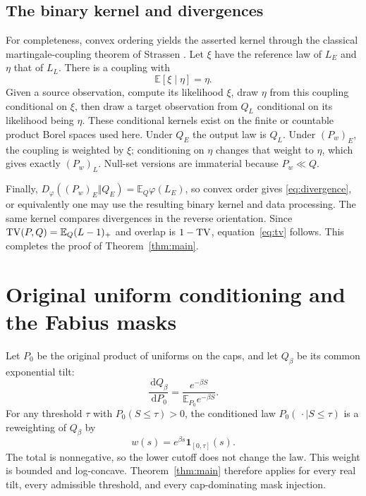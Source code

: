 \documentclass[11pt,a4paper]{article}
\theoremstyle{remark}\newtheorem*{ednote}{Editorial note (ProveIt, 2026-10-01)}
\newcommand{\E}{\mathbb E}\newcommand{\R}{\mathbb R}\newcommand{\N}{\mathbb N}
\newcommand{\ind}{\mathbf1}\newcommand{\dd}{\,\mathrm d}
\begin{document}
\subsection{The binary kernel and divergences}
For completeness, convex ordering yields the asserted kernel through the classical martingale-coupling theorem of Strassen \cite{Strassen}. Let $\xi$ have the reference law of $L_E$ and $\eta$ that of $L_L$. There is a coupling with
\[
 \E[\xi\mid\eta]=\eta.
\]
Given a source observation, compute its likelihood $\xi$, draw $\eta$ from this coupling conditional on $\xi$, then draw a target observation from $Q_L$ conditional on its likelihood being $\eta$. These conditional kernels exist on the finite or countable product Borel spaces used here. Under $Q_E$ the output law is $Q_L$. Under $(P_w)_E$, the coupling is weighted by $\xi$; conditioning on $\eta$ changes that weight to $\eta$, which gives exactly $(P_w)_L$. Null-set versions are immaterial because $P_w\ll Q$.

Finally, $D_\varphi((P_w)_E\Vert Q_E)=\E_Q\varphi(L_E)$, so convex order gives \eqref{eq:divergence}, or equivalently one may use the resulting binary kernel and data processing. The same kernel compares divergences in the reverse orientation. Since $\TV(P,Q)=\E_Q(L-1)_+$ and overlap is $1-\operatorname{TV}$, equation~\eqref{eq:tv} follows. This completes the proof of Theorem~\ref{thm:main}.

\section{Original uniform conditioning and the Fabius masks}
Let $P_0$ be the original product of uniforms on the caps, and let $Q_\beta$ be its common exponential tilt:
\[
 \frac{\dd Q_\beta}{\dd P_0}
 =\frac{e^{-\beta S}}{\E_{P_0}e^{-\beta S}}.
\]
For any threshold $\tau$ with $P_0(S\le\tau)>0$, the conditioned law $P_0(\,\cdot\mid S\le\tau)$ is a reweighting of $Q_\beta$ by
\[
 w(s)=e^{\beta s}\ind_{[0,\tau]}(s).
\]
The total is nonnegative, so the lower cutoff does not change the law. This weight is bounded and log-concave. Theorem~\ref{thm:main} therefore applies for every real tilt, every admissible threshold, and every cap-dominating mask injection.
\end{document}
